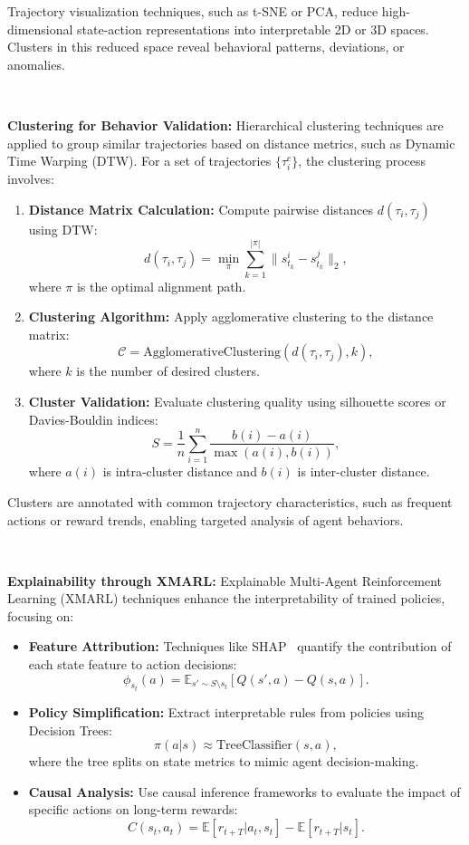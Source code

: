 \documentclass[conference]{IEEEtran}
\begin{document}
Trajectory visualization techniques, such as t-SNE or PCA, reduce high-dimensional state-action representations into interpretable 2D or 3D spaces. Clusters in this reduced space reveal behavioral patterns, deviations, or anomalies.

\

\noindent\textbf{Clustering for Behavior Validation:}
Hierarchical clustering techniques are applied to group similar trajectories based on distance metrics, such as Dynamic Time Warping (DTW). For a set of trajectories \( \{\tau_i^e\} \), the clustering process involves:
\begin{enumerate}
    \item \textbf{Distance Matrix Calculation:} Compute pairwise distances \( d(\tau_i, \tau_j) \) using DTW:
    \[
    d(\tau_i, \tau_j) = \min_{\pi} \sum_{k=1}^{|\pi|} \|s_{t_k}^i - s_{t_k}^j\|_2,
    \]
    where \( \pi \) is the optimal alignment path.
    \item \textbf{Clustering Algorithm:} Apply agglomerative clustering to the distance matrix:
    \[
    \mathcal{C} = \text{AgglomerativeClustering}(d(\tau_i, \tau_j), k),
    \]
    where \( k \) is the number of desired clusters.
    \item \textbf{Cluster Validation:} Evaluate clustering quality using silhouette scores or Davies-Bouldin indices:
    \[
    S = \frac{1}{n} \sum_{i=1}^n \frac{b(i) - a(i)}{\max(a(i), b(i))},
    \]
    where \( a(i) \) is intra-cluster distance and \( b(i) \) is inter-cluster distance.
\end{enumerate}

Clusters are annotated with common trajectory characteristics, such as frequent actions or reward trends, enabling targeted analysis of agent behaviors.

\

\noindent\textbf{Explainability through XMARL:}
Explainable Multi-Agent Reinforcement Learning (XMARL) techniques enhance the interpretability of trained policies, focusing on:
\begin{itemize}
    \item \textbf{Feature Attribution:} Techniques like SHAP~\cite{SHAP2020} quantify the contribution of each state feature to action decisions:
    \[
    \phi_{s_t}(a) = \mathbb{E}_{s' \sim S \setminus s_t} \left[ Q(s', a) - Q(s, a) \right].
    \]
    \item \textbf{Policy Simplification:} Extract interpretable rules from policies using Decision Trees:
    \[
    \pi(a|s) \approx \text{TreeClassifier}(s, a),
    \]
    where the tree splits on state metrics to mimic agent decision-making.
    \item \textbf{Causal Analysis:} Use causal inference frameworks to evaluate the impact of specific actions on long-term rewards:
    \[
    C(s_t, a_t) = \mathbb{E}[r_{t+T}|a_t, s_t] - \mathbb{E}[r_{t+T}|s_t].
    \]
\end{itemize}
\end{document}
